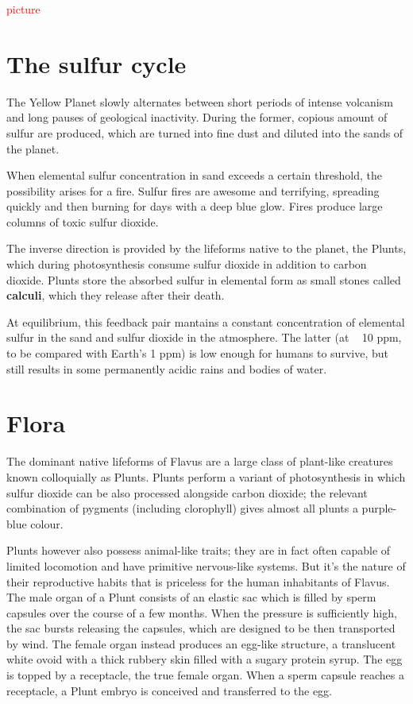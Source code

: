 \documentclass[10pt,oneside]{memoir}
\newcommand{\cmmnt}[1]{\textcolor{red}{#1}}
\begin{document}
\cmmnt{picture}


\vfill
\section{The sulfur cycle}

The Yellow Planet slowly alternates between short periods of intense volcanism and long pauses of geological inactivity. During the former, copious amount of sulfur are produced, which are turned into fine dust and diluted into the sands of the planet.

When elemental sulfur concentration in sand exceeds a certain threshold, the possibility arises for a fire. Sulfur fires are awesome and terrifying, spreading quickly and then burning for days with a deep blue glow. Fires produce large columns of toxic sulfur dioxide.

The inverse direction is provided by the lifeforms native to the planet, the Plunts, which during photosynthesis consume sulfur dioxide in addition to carbon dioxide. Plunts store the absorbed sulfur in elemental form as small stones called \textbf{calculi}, which they release after their death.

At equilibrium, this feedback pair mantains a constant concentration of elemental sulfur in the sand and sulfur dioxide in the atmosphere. The latter (at ~ 10 ppm, to be compared with Earth's 1 ppm) is low enough for humans to survive, but still results in some permanently acidic rains and bodies of water.
\vfill
\pagebreak

\section{Flora}

The dominant native lifeforms of Flavus are a large class of plant-like creatures known colloquially as Plunts. Plunts perform a variant of photosynthesis in which sulfur dioxide can be also processed alongside carbon dioxide; the relevant combination of pygments (including clorophyll) gives almost all plunts a purple-blue colour.

Plunts however also possess animal-like traits; they are in fact often capable of limited locomotion and have primitive nervous-like systems. But it's the nature of their reproductive habits that is priceless for the human inhabitants of Flavus. The male organ of a Plunt consists of an elastic sac which is filled by sperm capsules over the course of a few months. When the pressure is sufficiently high, the sac bursts releasing the capsules, which are designed to be then transported by wind. The female organ instead produces an egg-like structure, a translucent white ovoid with a thick rubbery skin filled with a sugary protein syrup. The egg is topped by a receptacle, the true female organ. When a sperm capsule reaches a receptacle, a Plunt embryo is conceived and transferred to the egg.
\end{document}
